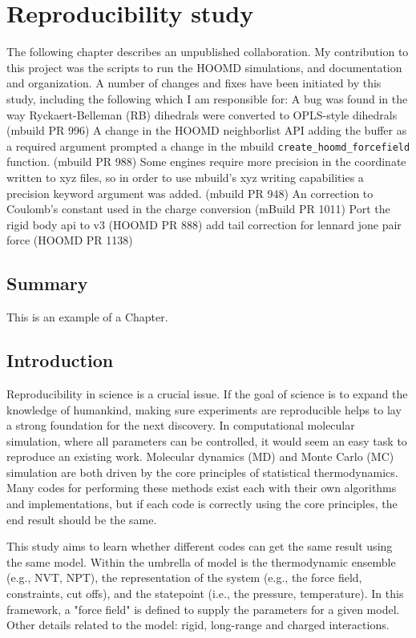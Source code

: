 \chapter{Reproducibility study}
\label{chap:reproducibility}

The following chapter describes an unpublished collaboration.
My contribution to this project was the scripts to run the HOOMD simulations, and documentation and organization. 
A number of changes and fixes have been initiated by this study, including the following which I am responsible for:
A bug was found in the way Ryckaert-Belleman (RB) dihedrals were converted to OPLS-style dihedrals (mbuild PR 996)
A change in the HOOMD neighborlist API adding the buffer as a required argument prompted a change in the mbuild \lstinline{create_hoomd_forcefield} function. (mbuild PR 988)
Some engines require more precision in the coordinate written to xyz files, so in order to use mbuild's xyz writing capabilities a precision keyword argument was added. (mbuild PR 948)
An correction to Coulomb's constant used in the charge conversion (mBuild PR 1011)
Port the rigid body api to v3 (HOOMD PR 888)
add tail correction for lennard jone pair force (HOOMD PR 1138)

\section{Summary}
 
This is an example of a Chapter. 

\section{Introduction}
Reproducibility in science is a crucial issue.
If the goal of science is to expand the knowledge of humankind, making sure experiments are reproducible helps to lay a strong foundation for the next discovery.
In computational molecular simulation, where all parameters can be controlled, it would seem an easy task to reproduce an existing work.
Molecular dynamics (MD) and Monte Carlo (MC) simulation are both driven by the core principles of statistical thermodynamics.
Many codes for performing these methods exist each with their own algorithms and implementations, but if each code is correctly using the core principles, the end result should be the same.

This study aims to learn whether different codes can get the same result using the same model.
Within the umbrella of model is the thermodynamic ensemble (e.g., NVT, NPT), the representation of the system (e.g., the force field, constraints, cut offs), and the statepoint (i.e., the pressure, temperature).
In this framework, a "force field" is defined to supply the parameters for a given model.
Other details related to the model: rigid, long-range and charged interactions.

